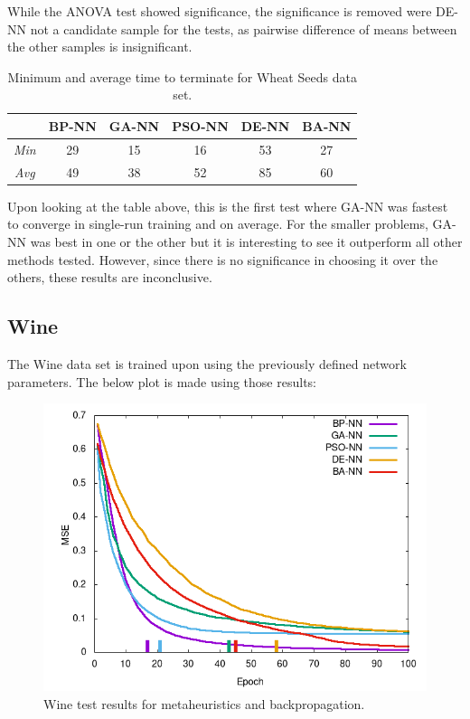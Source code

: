 \documentclass[a4paper,12pt]{article}
\begin{document}
While the ANOVA test showed significance, the significance is removed were DE-NN not a candidate sample for the tests, as pairwise difference of means between the other samples is insignificant.

\begin{table}[h!]
\centering
\begin{tabular}{c|c|c|c|c|c|}
\cline{2-6}
 & \textbf{BP-NN} & \textbf{GA-NN} & \textbf{PSO-NN} & \textbf{DE-NN} & \textbf{BA-NN} \\ \hline
\multicolumn{1}{|c|}{\textit{Min}} & \cellcolor[HTML]{FFFFFF}29 & \cellcolor[HTML]{C5F1BF}15 & \cellcolor[HTML]{FFFFFF}16 & \cellcolor[HTML]{FFCCC9}53 & \cellcolor[HTML]{FFFFFF}27 \\ \hline
\multicolumn{1}{|c|}{\textit{Avg}} & \cellcolor[HTML]{FFFFFF}49 & \cellcolor[HTML]{C5F1BF}38 & \cellcolor[HTML]{FFFFFF}52 & \cellcolor[HTML]{FFCCC9}85 & \cellcolor[HTML]{FFFFFF}60 \\ \hline
\end{tabular}
\caption{Minimum and average time to terminate for Wheat Seeds data set.}
\label{Tab:wheat-min}
\end{table}

Upon looking at the table above, this is the first test where GA-NN was fastest to converge in single-run training and on average. For the smaller problems, GA-NN was best in one or the other but it is interesting to see it outperform all other methods tested. However, since there is no significance in choosing it over the others, these results are inconclusive.

\pagebreak

\subsection{Wine}

The Wine data set is trained upon using the previously defined network parameters. The below plot is made using those results:

\begin{figure}[h!]
\centering
\includegraphics[scale=0.65]{images/wine-plot.png}
\caption{Wine test results for metaheuristics and backpropagation.}
\label{fig:wine}
\end{figure}
\end{document}
